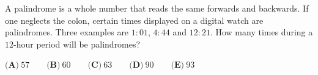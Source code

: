 A palindrome is a whole number that reads the same forwards and backwards. If one neglects the colon, certain times displayed on a digital watch are palindromes. Three examples are $1{:}01$, $4{:}44$ and $12{:}21$. How many times during a $12$-hour period will be palindromes?

$\textbf{(A)}\ 57\qquad\textbf{(B)}\ 60\qquad\textbf{(C)}\ 63\qquad\textbf{(D)}\ 90\qquad\textbf{(E)}\ 93$
